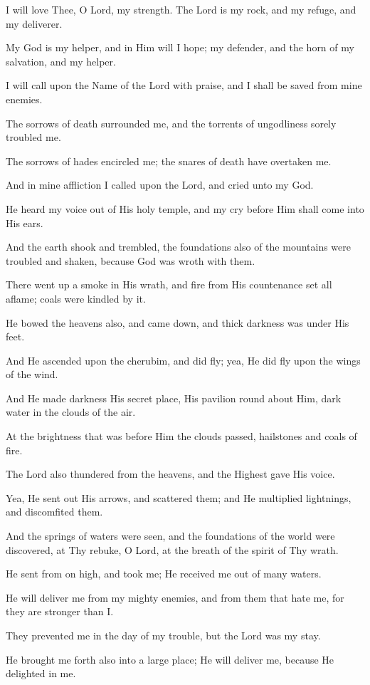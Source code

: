 I will love Thee, O Lord, my strength. The Lord is my rock, and my refuge, and my deliverer.

My God is my helper, and in Him will I hope; my defender, and the horn of my salvation, and my helper.

I will call upon the Name of the Lord with praise, and I shall be saved from mine enemies.

The sorrows of death surrounded me, and the torrents of ungodliness sorely troubled me.

The sorrows of hades encircled me; the snares of death have overtaken me.

And in mine affliction I called upon the Lord, and cried unto my God.

He heard my voice out of His holy temple, and my cry before Him shall come into His ears.

And the earth shook and trembled, the foundations also of the mountains were troubled and shaken, because God was wroth with them.

There went up a smoke in His wrath, and fire from His countenance set all aflame; coals were kindled by it.

He bowed the heavens also, and came down, and thick darkness was under His feet.

And He ascended upon the cherubim, and did fly; yea, He did fly upon the wings of the wind.

And He made darkness His secret place, His pavilion round about Him, dark water in the clouds of the air.

At the brightness that was before Him the clouds passed, hailstones and coals of fire.

The Lord also thundered from the heavens, and the Highest gave His voice.

Yea, He sent out His arrows, and scattered them; and He multiplied lightnings, and discomfited them.

And the springs of waters were seen, and the foundations of the world were discovered, at Thy rebuke, O Lord, at the breath of the spirit of Thy wrath.

He sent from on high, and took me; He received me out of many waters.

He will deliver me from my mighty enemies, and from them that hate me, for they are stronger than I.

They prevented me in the day of my trouble, but the Lord was my stay.

He brought me forth also into a large place; He will deliver me, because He delighted in me.

